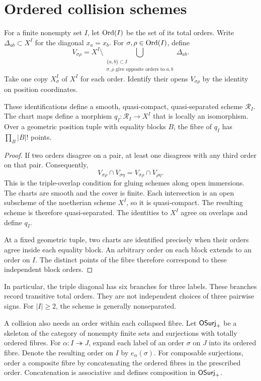 \section{Ordered collision schemes}\label{ogd:sec:geometry}

For\label{ogd:def:finite-set-total-orders} a finite nonempty set \(I\), let \(\operatorname{Ord}(I)\) be the set of its total orders.
Write \(\Delta_{ab}\subset X^I\) for the diagonal \(x_a=x_b\).
For \(\sigma,\rho\in\operatorname{Ord}(I)\), define
\[
 V_{\sigma\rho}=X^I\setminus
 \bigcup_{\substack{\{a,b\}\subset I\\
       \sigma,\rho\text{ give opposite orders to }a,b}}\Delta_{ab}.
\]
Take one copy \(X^I_\sigma\) of \(X^I\) for each order.
Identify their opens \(V_{\sigma\rho}\) by the identity on position coordinates.

\begin{proposition}\label{ogd:prop:glue}
These identifications define a smooth, quasi-compact, quasi-separated scheme \(\mathscr R_I\).
The chart maps define a morphism \(q_I:\mathscr R_I\to X^I\) that is locally an isomorphism.
Over a geometric position tuple with equality blocks \(B\), the fibre of \(q_I\) has \(\prod_B |B|!\) points.
\end{proposition}
\begin{proof}
If two orders disagree on a pair, at least one disagrees with any third order on that pair.
Consequently,
\[
 V_{\sigma\rho}\cap V_{\sigma\eta}
   =V_{\sigma\rho}\cap V_{\rho\eta}.
\]
This is the triple-overlap condition for gluing schemes along open immersions.
The charts are smooth and the cover is finite.
Each intersection is an open subscheme of the noetherian scheme \(X^I\), so it is quasi-compact.
The resulting scheme is therefore quasi-separated.
The identities to \(X^I\) agree on overlaps and define \(q_I\).

At a fixed geometric tuple, two charts are identified precisely when their orders agree inside each equality block.
An arbitrary order on each block extends to an order on \(I\).
The distinct points of the fibre therefore correspond to these independent block orders.
\end{proof}

In particular, the triple diagonal has six branches for three labels.
These branches record transitive total orders.
They are not independent choices of three pairwise signs.
For \(|I|\geq2\), the scheme is generally nonseparated.

A\label{ogd:def:ordered-fibre-surjection-category} collision also needs an order within each collapsed fibre.
Let \(\mathsf{OSurj}_+\) be a skeleton of the category of nonempty finite sets and surjections with totally ordered fibres.
For \(\alpha:I\twoheadrightarrow J\), expand each label of an order \(\sigma\) on \(J\) into its ordered fibre.
Denote the resulting order on \(I\) by \(e_\alpha(\sigma)\).
For composable surjections, order a composite fibre by concatenating the ordered fibres in the prescribed order.
Concatenation is associative and defines composition in \(\mathsf{OSurj}_+\).

